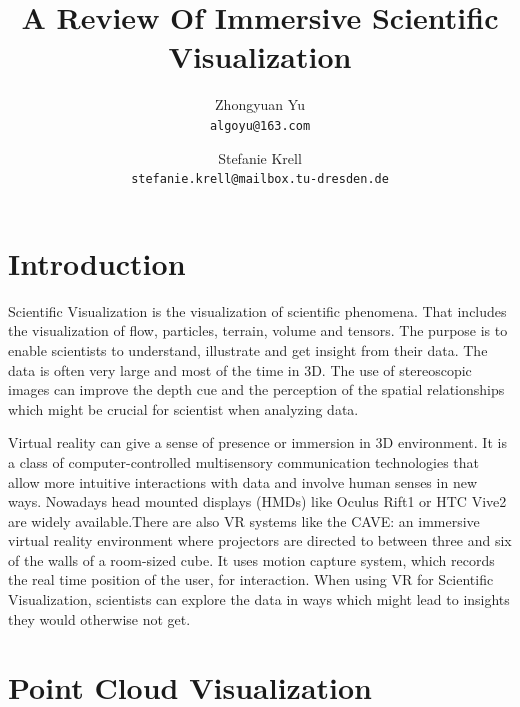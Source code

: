 \documentclass[10pt,twocolumn,letterpaper]{article}
\begin{document}
\title{A Review Of Immersive Scientific Visualization}

\author{Zhongyuan Yu\\
{\tt\small algoyu@163.com}
\and
Stefanie Krell\\
{\tt\small stefanie.krell@mailbox.tu-dresden.de}
}

\maketitle


\section{Introduction}
Scientific Visualization is the visualization of scientific phenomena. That includes the visualization of flow, particles, terrain, volume and tensors. The purpose is to enable scientists to understand, illustrate and get insight from their data. The data is often very large and most of the time in 3D. The use of stereoscopic images can improve the depth cue and the perception of the spatial relationships which might be crucial for scientist when analyzing data.

\setlength{\parindent}{1pc}
Virtual reality can give a sense of presence or immersion in 3D environment. It is a class of computer-controlled multisensory communication technologies that allow more intuitive interactions with data and involve human senses in new ways. Nowadays head mounted displays (HMDs) like Oculus Rift1 or HTC Vive2 are widely available.There are also VR systems like the CAVE: an immersive virtual reality environment where projectors are directed to between three and six of the walls of a room-sized cube. It uses motion capture system, which records the real time position of the user, for interaction. When using VR for Scientific Visualization, scientists can explore the data in ways which might lead to insights they would otherwise not get.
\section{Point Cloud Visualization}
\end{document}
